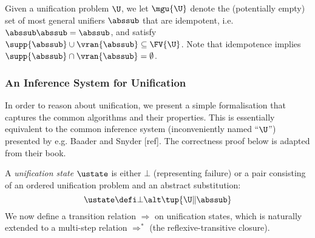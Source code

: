 Given a unification problem $\U$, we let $\mgu{\U}$ denote the (potentially empty) set of most general unifiers $\abssub$ that are idempotent, i.e. $\abssub \abssub = \abssub$, and
satisfy $\supp{\abssub} \cup \vran{\abssub} \subseteq \FV{\U}$. Note that idempotence implies $\supp{\abssub} \cap \vran{\abssub} = \emptyset$.


\subsubsection*{An Inference System for Unification}

In order to reason about unification, we present a simple formalisation that captures the common algorithms and their properties.
This is essentially equivalent to the common inference system (inconveniently named ``$\U$'') presented by e.g. Baader and Snyder [ref].
The correctness proof below is adapted from their book.

A \emph{unification state} $\ustate$ is either $\bot$ (representing failure) or a pair consisting of an ordered unification problem and an abstract substitution:
\[ \ustate \defi \bot \alt \tup{\U \| \abssub} \]
We now define a transition relation $\Longrightarrow$ on unification states, which is naturally extended to a multi-step relation $\Longrightarrow^*$ (the reflexive-transitive closure).

